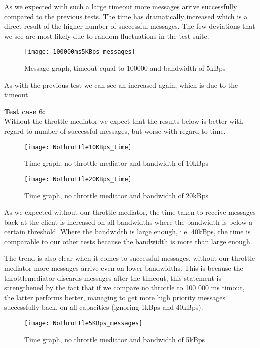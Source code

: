 	As we expected with such a large timeout more messages arrive successfully compared to the previous tests. The time has dramatically increased which is a direct result of the higher number of successful messages. The few deviations that we see are most likely due to random fluctuations in the test suite. 
	
	\begin{figure}[H]
		\centering
		\texttt{[image: 100000ms5KBps\_messages]}
		\caption{Message graph, timeout equal to 100000 and bandwidth of 5kBps} 
		\label{figure:results:100000ms5KBps_messages}
	\end{figure}
	As with the previous test we can see an increased again, which is due to the timeout.
    
    \textbf{Test case 6:}\\
    Without the throttle mediator we expect that the results below is better with regard to number of successful messages, but worse with regard to time.
    \begin{figure}[H]
		\centering
		\texttt{[image: NoThrottle10KBps\_time]}
		\caption{Time graph, no throttle mediator and bandwidth of 10kBps} 
		\label{figure:results:NoThrottle10KBps_time}
	\end{figure}
	
	\begin{figure}[H]
		\centering
		\texttt{[image: NoThrottle20KBps\_time]}
		\caption{Time graph, no throttle mediator and bandwidth of 20kBps} 
		\label{figure:results:NoThrottle20KBps_time}
	\end{figure}
	
	As we expected without our throttle mediator, the time taken to receive messages back at the client is increased on all bandwidths where the bandwidth is below a certain threshold. Where the bandwidth is large enough, i.e. 40kBps, the time is comparable to our other tests because the bandwidth is more than large enough.
	
	The trend is also clear when it comes to successful messages, without our throttle mediator more messages arrive even on lower bandwidths. This is because the throttlemediator discards messages after the timeout, this statement is strengthened by the fact that if we compare no throttle to 100 000 ms timout, the latter performs better, managing to get more high priority messages successfully back, on all capacities (ignoring 1kBps and 40kBps).
	
	\begin{figure}[H]
		\centering
		\texttt{[image: NoThrottle5KBps\_messages]}
		\caption{Time graph, no throttle mediator and bandwidth of 5kBps} 
		\label{figure:results:NoThrottle5KBps_messages}
	\end{figure}\\

